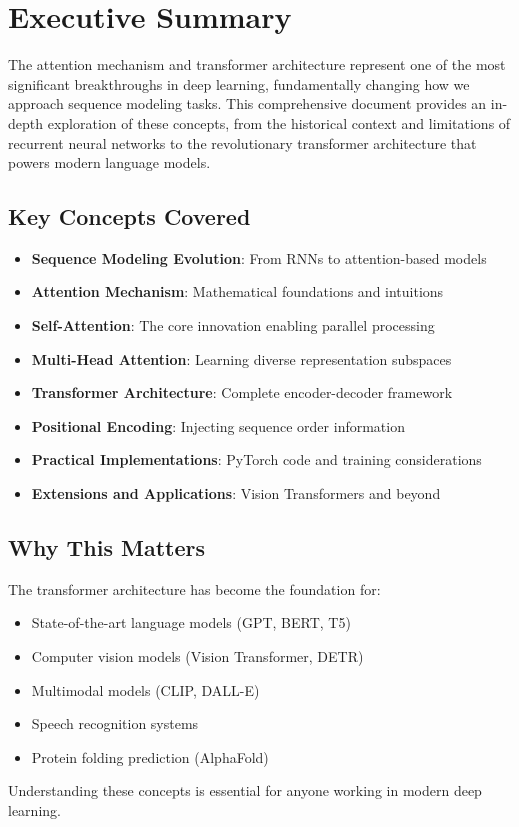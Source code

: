 
\section{Executive Summary}

The attention mechanism and transformer architecture represent one of the most significant breakthroughs in deep learning, fundamentally changing how we approach sequence modeling tasks. This comprehensive document provides an in-depth exploration of these concepts, from the historical context and limitations of recurrent neural networks to the revolutionary transformer architecture that powers modern language models.

\subsection{Key Concepts Covered}

\begin{itemize}
    \item \textbf{Sequence Modeling Evolution}: From RNNs to attention-based models
    \item \textbf{Attention Mechanism}: Mathematical foundations and intuitions
    \item \textbf{Self-Attention}: The core innovation enabling parallel processing
    \item \textbf{Multi-Head Attention}: Learning diverse representation subspaces
    \item \textbf{Transformer Architecture}: Complete encoder-decoder framework
    \item \textbf{Positional Encoding}: Injecting sequence order information
    \item \textbf{Practical Implementations}: PyTorch code and training considerations
    \item \textbf{Extensions and Applications}: Vision Transformers and beyond
\end{itemize}

\subsection{Why This Matters}

The transformer architecture has become the foundation for:
\begin{itemize}
    \item State-of-the-art language models (GPT, BERT, T5)
    \item Computer vision models (Vision Transformer, DETR)
    \item Multimodal models (CLIP, DALL-E)
    \item Speech recognition systems
    \item Protein folding prediction (AlphaFold)
\end{itemize}

Understanding these concepts is essential for anyone working in modern deep learning.
